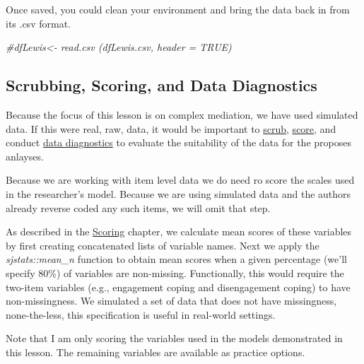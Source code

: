 \documentclass[
  11pt,
]{book}
\newenvironment{Shaded}{\begin{snugshade}}{\end{snugshade}}
\newcommand{\CommentTok}[1]{\textcolor[rgb]{0.37,0.37,0.37}{\textit{#1}}}
\begin{document}
Once saved, you could clean your environment and bring the data back in from its .csv format.

\begin{Shaded}
\begin{Highlighting}[]
\CommentTok{\#dfLewis\textless{}{-} read.csv (\textquotesingle{}dfLewis.csv\textquotesingle{}, header = TRUE)}
\end{Highlighting}
\end{Shaded}

\hypertarget{scrubbing-scoring-and-data-diagnostics-1}{%
\subsection{Scrubbing, Scoring, and Data Diagnostics}\label{scrubbing-scoring-and-data-diagnostics-1}}

Because the focus of this lesson is on complex mediation, we have used simulated data. If this were real, raw, data, it would be important to \href{https://lhbikos.github.io/ReC_MultivModel/scrub.html}{scrub}, \href{https://lhbikos.github.io/ReC_MultivModel/score.html}{score}, and conduct \href{https://lhbikos.github.io/ReC_MultivModel/DataDx.html}{data diagnostics} to evaluate the suitability of the data for the proposes anlayses.

Because we are working with item level data we do need ro score the scales used in the researcher's model. Because we are using simulated data and the authors already reverse coded any such items, we will omit that step.

As described in the \href{https://lhbikos.github.io/ReC_MultivModel/score.html}{Scoring} chapter, we calculate mean scores of these variables by first creating concatenated lists of variable names. Next we apply the \emph{sjstats::mean\_n} function to obtain mean scores when a given percentage (we'll specify 80\%) of variables are non-missing. Functionally, this would require the two-item variables (e.g., engagement coping and disengagement coping) to have non-missingness. We simulated a set of data that does not have missingness, none-the-less, this specification is useful in real-world settings.

Note that I am only scoring the variables used in the models demonstrated in this lesson. The remaining variables are available as practice options.
\end{document}
